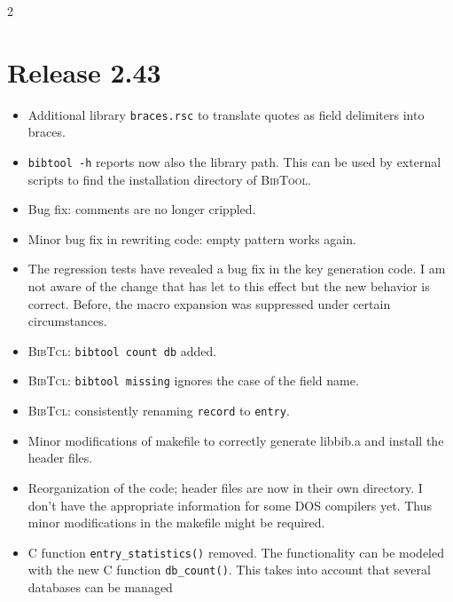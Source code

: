 \documentclass[11pt,a4paper]{scrartcl}
\newcommand\rsc[1]{\texttt{#1}}
\newcommand\File[1]{\textsf{#1}}
\newcommand\BibTool{\textsc{BibTool}}
\newcommand\BibTcl{\textsc{BibTcl}}
\newenvironment{Releases}{\begin{multicols}2\RaggedRight}{\end{multicols}}
\newenvironment{Release}[2]{%
  \def\tmp{#2}%
  \section*{Release #1 \ifx\tmp\empty\else{\normalsize[#2]}\fi}
  \begin{itemize}
}{\end{itemize}}
\newenvironment{Fix}[1]{\item }{}
\newenvironment{New}[1]{\item }{}
\newenvironment{Update}[1]{\item }{}
\begin{document}
\begin{Releases}
 \begin{Release}{2.43}{}
  \begin{New}{gene}
    Additional library \rsc{braces.rsc} to translate quotes as field
    delimiters into braces.
  \end{New}
  \begin{Update}{gene}
    \verb|bibtool -h| reports now also the library path. This can be
    used by external scripts to find the installation directory of
    \BibTool.
  \end{Update}
  \begin{Fix}{gene}
    Bug fix: comments are no longer crippled.
  \end{Fix}
  \begin{Fix}{gene}
    Minor bug fix in rewriting code: empty pattern works again.
  \end{Fix}
  \begin{Fix}{gene}
    The regression tests have revealed a bug fix in the key generation
    code. I am not aware of the change that has let to this effect but
    the new behavior is correct. Before, the macro expansion was
    suppressed under certain circumstances.
  \end{Fix}
  \begin{New}{gene}
    \BibTcl: \verb|bibtool count db| added.
  \end{New}
  \begin{Fix}{gene}
    \BibTcl: \verb|bibtool missing| ignores the case of the field
    name.
  \end{Fix}
  \begin{Update}{gene}
    \BibTcl: consistently renaming \verb|record| to \verb|entry|.
  \end{Update}
  \begin{Fix}{gene}
    Minor modifications of makefile to correctly generate
    \File{libbib.a} and install the header files.
  \end{Fix}
  \begin{Update}{gene}
    Reorganization of the code; header files are now in their own directory. I
    don't have the appropriate information for some DOS compilers yet.
    Thus minor modifications in the makefile might be required.
  \end{Update}
  \begin{New}{gene}
    C function \verb|entry_statistics()| removed. The functionality
    can be modeled with the new C function \verb|db_count()|. This
    takes into account that several databases can be managed

\end{New}
\end{Release}
\end{Releases}
\end{document}
